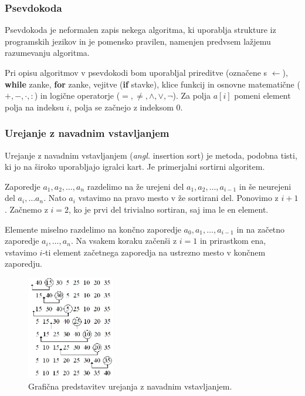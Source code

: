 \documentclass[a4paper,oneside]{article}
\begin{document}
\subsubsection{Psevdokoda}
Psevdokoda je neformalen zapis nekega algoritma, ki uporablja strukture iz programskih
jezikov in je pomensko pravilen, namenjen predvsem lažjemu razumevanju algoritma.

Pri opisu algoritmov v psevdokodi bom uporabljal prireditve (označene s $\gets$), \textbf{while} zanke, \textbf{for} zanke,
vejitve (\textbf{if} stavke), klice funkcij in osnovne  matematične ($+, -, \cdot, :$) in
logične operatorje ($=, \neq, \wedge, \vee, \neg$). Za polja $a[i]$ pomeni
element polja na indeksu $i$, polja se začnejo z indeksom $0$.

\subsubsection{Urejanje z navadnim vstavljanjem}
\label{chapter:insertionsort}
Urejanje z navadnim vstavljanjem (\emph{angl.} insertion sort) je metoda,
podobna tisti, ki jo na široko uporabljajo igralci kart. Je primerjalni sortirni algoritem.

Zaporedje $a_1, a_2, \ldots, a_n$ razdelimo na že urejeni del $a_1, a_2, \ldots, a_{i-1}$
in še neurejeni del $a_i, \ldots a_n$. Nato $a_i$ vstavimo na pravo mesto v že sortirani
del. Ponovimo z $i + 1$. Začnemo z $i = 2$, ko je prvi del trivialno sortiran, saj ima le
en element.

Elemente miselno razdelimo na končno zaporedje $a_0, a_1, \ldots,
a_{i-1}$ in na začetno zaporedje $a_i,\ldots, a_n$. Na vsakem koraku začenši z $i = 1$ in
prirastkom ena, vstavimo $i$-ti element začetnega zaporedja na ustrezno mesto v končnem
zaporedju.

\begin{figure}[h]
    \begin{center}
        \includegraphics[height=45mm]{slike/insertionsort.png}
    \end{center}
    \vspace{-0.7cm}
    \caption{Grafična predstavitev urejanja z navadnim vstavljanjem.}
    \label{fig:insertionsortimage}
\end{figure}
\end{document}

